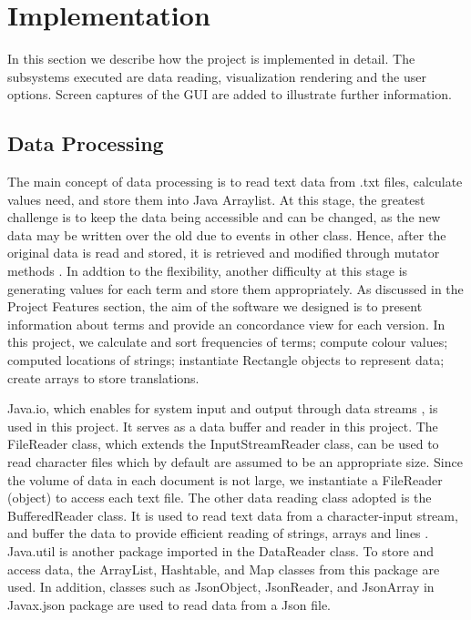 \clearpage
\section{Implementation}
In this section we describe how the project is implemented in detail. The subsystems executed are data reading, visualization rendering and the user options. Screen captures of the GUI are added to illustrate further information.

\subsection{Data Processing}

The main concept of data processing is to read text data from .txt files, calculate values need, and store them into Java Arraylist. At this stage, the greatest challenge is to keep the data being accessible and can be changed, as  the new data may be written over the old due to events in other class. Hence, after the original data is read and stored, it is retrieved and modified through  mutator methods \cite{Bob's coding convention}. In addtion to the flexibility, another difficulty at this stage is generating values for each term and store them appropriately. As discussed in the Project Features section, the aim of the software we designed is to present information about terms and provide an concordance view for each version. In this project, we calculate and sort frequencies of terms; compute colour values; computed locations of strings; instantiate Rectangle objects to represent data; create arrays to store translations.

Java.io, which enables for system input and output through data streams \cite{javadoc java.io}, is used in this project. It serves as a data buffer and reader in this project. The FileReader class, which extends the InputStreamReader class, can be used to read character files which by default are assumed to be an appropriate size. Since the volume of data in each document is not large, we instantiate a FileReader (object) to access each text file. The other data reading class adopted is the BufferedReader class. It is used to read text data from a character-input stream, and buffer the data to provide efficient reading of strings, arrays and lines \cite{javadoc7}. Java.util is another package imported in the DataReader class. To store and access data, the ArrayList, Hashtable, and Map classes from this package are used. In addition, classes such as JsonObject, JsonReader, and JsonArray in Javax.json package are used to read data from a Json file.

